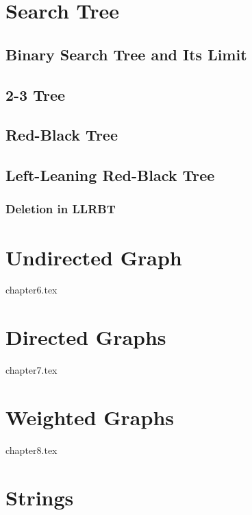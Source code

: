 \documentclass{report}
\begin{document}

\chapter{Search Tree}

\section{Binary Search Tree and Its Limit}

\section{2-3 Tree}

\section{Red-Black Tree}

\section{Left-Leaning Red-Black Tree}

\subsection{Deletion in LLRBT}


\chapter{Undirected Graph}

{chapter6.tex}


\chapter{Directed Graphs}

{chapter7.tex}


\chapter{Weighted Graphs}

{chapter8.tex}


\chapter{Strings}
\end{document}
